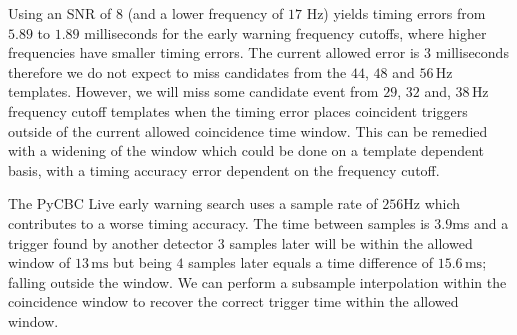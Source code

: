 %
Using an SNR of $8$ (and a lower frequency of $17$ Hz) yields timing errors from $5.89$ to $1.89$ milliseconds for the early warning frequency cutoffs, where higher frequencies have smaller timing errors. The current allowed error is $3$ milliseconds therefore we do not expect to miss candidates from the $44$, $48$ and $56 \, \text{Hz}$ templates. However, we will miss some candidate event from $29$, $32$ and, $38 \, \text{Hz}$ frequency cutoff templates when the timing error places coincident triggers outside of the current allowed coincidence time window. This can be remedied with a widening of the window which could be done on a template dependent basis, with a timing accuracy error dependent on the frequency cutoff.

The PyCBC Live early warning search uses a sample rate of $256$Hz which contributes to a worse timing accuracy. The time between samples is $3.9$ms and a trigger found by another detector $3$ samples later will be within the allowed window of $13 \, \text{ms}$ but being $4$ samples later equals a time difference of $15.6  \, \text{ms}$; falling outside the window. We can perform a subsample interpolation within the coincidence window to recover the correct trigger time within the allowed window.

